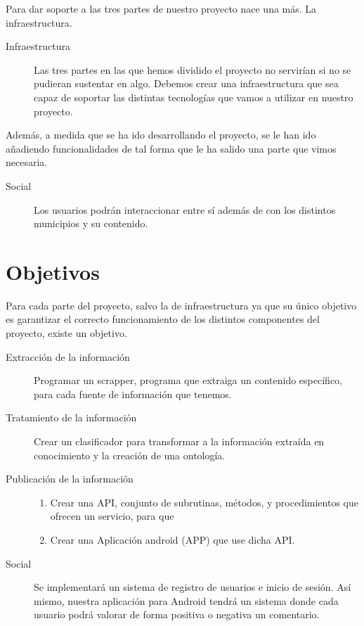 Para dar soporte a las tres partes de nuestro proyecto nace una más. La infraestructura.

\begin{description}
\item[Infraestructura]
Las tres partes en las que hemos dividido el proyecto no servirían si no se pudieran sustentar en algo. Debemos crear una infraestructura que sea capaz de soportar las distintas tecnologías que vamos a utilizar en nuestro proyecto.
\end{description}

Además, a medida que se ha ido desarrollando el proyecto, se le han ido añadiendo funcionalidades de tal forma que le ha salido una parte que vimos necesaria.

\begin{description}
\item[Social]
Los usuarios podrán interaccionar entre sí además de con los distintos municipios y su contenido.
\end{description}


\section*{Objetivos}
Para cada parte del proyecto, salvo la de infraestructura ya que su único objetivo es garantizar el correcto funcionamiento de los distintos componentes del proyecto, existe un objetivo.

\begin{description}
\item[Extracción de la información]
Programar un scrapper, programa que extraiga un contenido específico, para cada fuente de información que tenemos.

\item[Tratamiento de la información] 
Crear un clasificador para transformar a la información extraída en conocimiento y la creación de una ontología.

\item[Publicación de la información]
\begin{enumerate}
\item Crear una API, conjunto de subrutinas, métodos, y procedimientos que ofrecen un servicio, para que 
\item Crear una Aplicación android (APP) que use dicha API.
\end{enumerate}

\item[Social]
 Se implementará un sistema de registro de usuarios e inicio de sesión. Así mismo, nuestra aplicación para Android tendrá un sistema donde cada usuario podrá valorar de forma positiva o negativa un comentario.
\end{description}






%